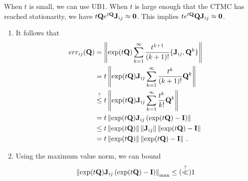 \documentclass[12pt]{article} %
\begin{document}
When $t$ is small, we can use UB1.  When $t$ is large enough that the CTMC has reached stationarity, we have $t\mathbf{Q} e^{t\mathbf{Q}} \mathbf{J}_{ij} \approx \boldsymbol{0}$. This implies $t e^{t\mathbf{Q}}\mathbf{Q} \mathbf{J}_{ij} \approx \boldsymbol{0}$.


\begin{enumerate}	
	\item  It follows that
	\begin{align*}
		err_{ij}(\mathbf{Q}) &=  \left\Vert \exp(t\mathbf{Q})  \sum_{k=1}^\infty \frac{t^{k+1}}{(k+1)!} \{\mathbf{J}_{ij},\mathbf{Q}^k\} \right\Vert \\
		&=t \left\Vert \exp(t\mathbf{Q}) \mathbf{J}_{ij}  \sum_{k=1}^\infty \frac{t^{k}}{(k+1)!} \mathbf{Q}^k \right\Vert \\
		&\stackrel{?}{\leq} t \left\Vert \exp(t\mathbf{Q}) \mathbf{J}_{ij}  \sum_{k=1}^\infty \frac{t^{k}}{k!} \mathbf{Q}^k \right\Vert \\
		&= t \left\Vert \exp(t\mathbf{Q}) \mathbf{J}_{ij}  \left( \exp(t\mathbf{Q})-\mathbf{I} \right) \right\Vert  \\
		&\leq t      \left\Vert\exp(t\mathbf{Q})\right\Vert \left\Vert\mathbf{J}_{ij}\right\Vert \left\Vert\exp(t\mathbf{Q})-\mathbf{I} \right\Vert \\
		&= t      \left\Vert\exp(t\mathbf{Q})\right\Vert \left\Vert\exp(t\mathbf{Q})-\mathbf{I} \right\Vert \, .
	\end{align*}
	\item Using the maximum value norm, we can bound 
	\begin{align*}
\left\Vert \exp(t\mathbf{Q}) \mathbf{J}_{ij}  \left( \exp(t\mathbf{Q})-\mathbf{I} \right) \right\Vert_{\max}  \leq (\stackrel{?}{\ll}) 1
	\end{align*}
\end{enumerate}

%
%
\end{document}
